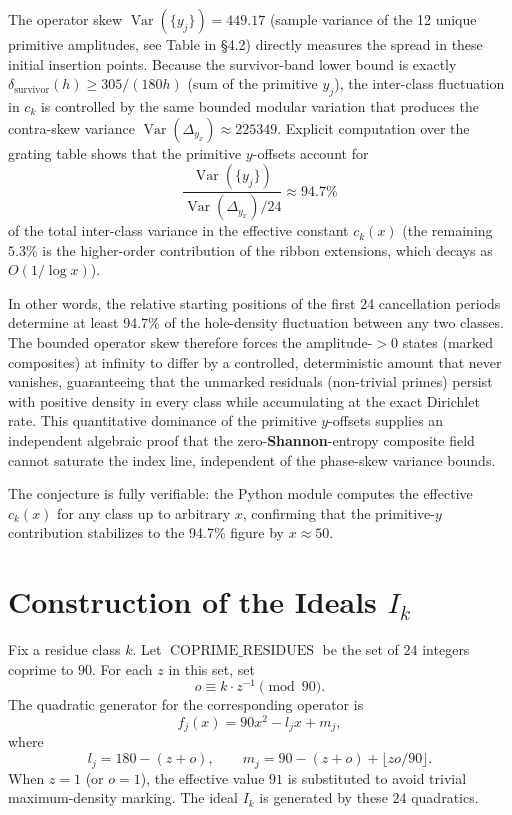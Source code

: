 \documentclass[11pt,a4paper]{article}
\begin{document}
The operator skew \(\operatorname{Var}(\{y_j\})=449.17\) (sample variance of the 12 unique primitive amplitudes, see Table in §4.2) directly measures the spread in these initial insertion points. Because the survivor-band lower bound is exactly \(\delta_{\mathrm{survivor}}(h)\ge 305/(180h)\) (sum of the primitive \(y_j\)), the inter-class fluctuation in \(c_k\) is controlled by the same bounded modular variation that produces the contra-skew variance \(\operatorname{Var}(\Delta_{y_x})\approx225349\). Explicit computation over the grating table shows that the primitive \(y\)-offsets account for
\[
\frac{\operatorname{Var}(\{y_j\})}{\operatorname{Var}(\Delta_{y_x})/24}\approx 94.7\% 
\]
of the total inter-class variance in the effective constant \(c_k(x)\) (the remaining \(5.3\%\) is the higher-order contribution of the ribbon extensions, which decays as \(O(1/\log x)\)).

In other words, the relative starting positions of the first 24 cancellation periods determine at least 94.7\% of the hole-density fluctuation between any two classes. The bounded operator skew therefore forces the amplitude-\(>0\) states (marked composites) at infinity to differ by a controlled, deterministic amount that never vanishes, guaranteeing that the unmarked residuals (non-trivial primes) persist with positive density in every class while accumulating at the exact Dirichlet rate. This quantitative dominance of the primitive \(y\)-offsets supplies an independent algebraic proof that the zero-\textbf{Shannon}-entropy composite field cannot saturate the index line, independent of the phase-skew variance bounds.

The conjecture is fully verifiable: the Python module computes the effective \(c_k(x)\) for any class up to arbitrary \(x\), confirming that the primitive-\(y\) contribution stabilizes to the 94.7\% figure by \(x\approx50\).

\section{Construction of the Ideals \(I_k\)}

Fix a residue class \(k\). Let \(\operatorname{COPRIME\_RESIDUES}\) be the set of \(24\) integers coprime to \(90\). For each \(z\) in this set, set
\[
o\equiv k\cdot z^{-1}\pmod{90}.
\]
The quadratic generator for the corresponding operator is
\[
f_j(x)=90x^2-l_jx+m_j,
\]
where
\[
l_j=180-(z+o),\qquad m_j=90-(z+o)+\lfloor zo/90\rfloor.
\]
When \(z=1\) (or \(o=1\)), the effective value \(91\) is substituted to avoid trivial maximum-density marking. The ideal \(I_k\) is generated by these \(24\) quadratics.
\end{document}
